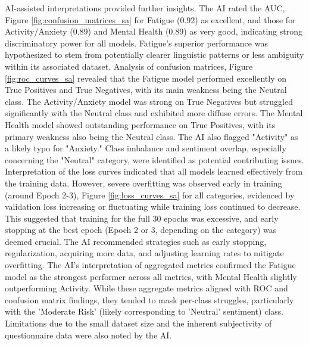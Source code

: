 AI-assisted interpretations provided further insights. The AI rated the AUC, Figure \ref{fig:confusion_matrices_sa} for Fatigue (0.92) as excellent, and those for Activity/Anxiety (0.89) and Mental Health (0.89) as very good, indicating strong discriminatory power for all models. Fatigue's superior performance was hypothesized to stem from potentially clearer linguistic patterns or less ambiguity within its associated dataset. Analysis of confusion matrices, Figure \ref{fig:roc_curves_sa} revealed that the Fatigue model performed excellently on True Positives and True Negatives, with its main weakness being the Neutral class. The Activity/Anxiety model was strong on True Negatives but struggled significantly with the Neutral class and exhibited more diffuse errors. The Mental Health model showed outstanding performance on True Positives, with its primary weakness also being the Neutral class. The AI also flagged "Activity" as a likely typo for "Anxiety." Class imbalance and sentiment overlap, especially concerning the "Neutral" category, were identified as potential contributing issues. Interpretation of the loss curves indicated that all models learned effectively from the training data. However, severe overfitting was observed early in training (around Epoch 2-3), Figure \ref{fig:loss_curves_sa} for all categories, evidenced by validation loss increasing or fluctuating while training loss continued to decrease. This suggested that training for the full 30 epochs was excessive, and early stopping at the best epoch (Epoch 2 or 3, depending on the category) was deemed crucial. The AI recommended strategies such as early stopping, regularization, acquiring more data, and adjusting learning rates to mitigate overfitting. The AI's interpretation of aggregated metrics confirmed the Fatigue model as the strongest performer across all metrics, with Mental Health slightly outperforming Activity. While these aggregate metrics aligned with ROC and confusion matrix findings, they tended to mask per-class struggles, particularly with the 'Moderate Risk' (likely corresponding to 'Neutral' sentiment) class. Limitations due to the small dataset size and the inherent subjectivity of questionnaire data were also noted by the AI.

